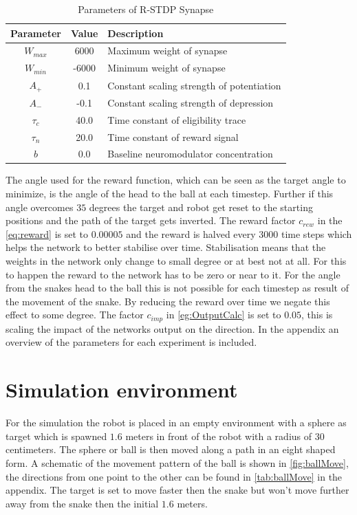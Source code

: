 \begin{table}[htpb]
  \caption[Parameters R-STDP synapse]{Parameters of R-STDP Synapse} \label{tab:baseRstdp}
  \centering
  \begin{tabular}{|c| c |l|}
      \toprule
      Parameter & Value & Description \\
      \midrule
      $W_{max}$ & 6000   & Maximum weight of synapse\\   
      $W_{min}$ & -6000  & Minimum weight of synapse\\   
      $A_{+}$   & 0.1    & Constant scaling strength of potentiation\\   
      $A_{-}$   & -0.1   & Constant scaling strength of depression \\   
      $\tau_c$  & 40.0   & Time constant of eligibility trace \\  
      $\tau_n$  & 20.0   & Time constant of reward signal  \\   
      $b$       & 0.0    & Baseline neuromodulator concentration \\    
      \bottomrule
  \end{tabular}
  \end{table}

The angle used for the reward function, which can be seen as the target angle to minimize, is the angle of the head to the ball at each timestep. Further if this angle overcomes $35$ degrees the target and robot get reset to the starting positions and the path of the target gets inverted.
The reward factor $c_{rew}$ in the \autoref{eq:reward} is set to $0.00005$ and the reward is halved every $3000$ time steps which helps the network to better stabilise over time. Stabilisation means that the weights in the network only change to small degree or at best not at all. For this to happen the reward to the network has to be zero or near to it. For the angle from the snakes head to the ball this is not possible for each timestep as result of the movement of the snake. By reducing the reward over time we negate this effect to some degree. The factor $c_{imp}$ in \autoref{eg:OutputCalc} is set to $0.05$, this is scaling the impact of the networks output on the direction. In the appendix an overview of the parameters for each experiment is included.  

\section{Simulation environment}
For the simulation the robot is placed in an empty environment with a sphere as target which is spawned $1.6$ meters in front of the robot with a radius of $30$ centimeters. The sphere or ball is then moved along a path in an eight shaped form. A schematic of the movement pattern of the ball is shown in \autoref{fig:ballMove}, the directions from one point to the other can be found in \autoref{tab:ballMove} in the appendix.
The target is set to move faster then the snake but won’t move further away from the snake then the initial $1.6$ meters.


